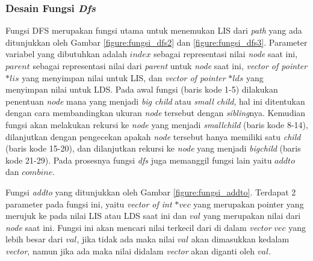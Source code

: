 	\subsubsection{\quad Desain Fungsi \textit{Dfs}}
	\quad Fungsi DFS merupakan fungsi utama untuk menemukan LIS dari \textit{path} yang ada ditunjukkan oleh Gambar \ref{figure:fungsi_dfs2} dan \ref{figure:fungsi_dfs3}. Parameter variabel yang dibutuhkan adalah $index$ sebagai representasi nilai \textit{node} saat ini, $parent$ sebagai representasi nilai dari \textit{parent} untuk \textit{node} saat ini, \textit{vector of pointer} $*lis$ yang menyimpan nilai untuk LIS, dan \textit{vector of pointer} $*lds$ yang menyimpan nilai untuk LDS. Pada awal fungsi (baris kode 1-5) dilakukan penentuan \textit{node} mana yang menjadi \textit{big child} atau \textit{small child}, hal ini ditentukan dengan cara membandingkan ukuran \textit{node} tersebut dengan \textit{sibling}nya. Kemudian fungsi akan melakukan rekursi ke \textit{node} yang menjadi \textit{smallchild} (baris kode 8-14), dilanjutkan dengan pengecekan apakah \textit{node} tersebut hanya memiliki satu \textit{child} (baris kode 15-20), dan dilanjutkan rekursi ke \textit{node} yang menjadi \textit{bigchild} (baris kode 21-29). Pada prosesnya fungsi \textit{dfs} juga memanggil fungsi lain yaitu $addto$ dan $combine$.
	 
	\quad Fungsi \textit{addto} yang ditunjukkan oleh Gambar \ref{figure:fungsi_addto}. Terdapat 2 parameter pada fungsi ini, yaitu \textit{vector of int} $*vec$ yang merupakan pointer yang merujuk ke pada nilai LIS atau LDS saat ini dan $val$ yang merupakan nilai dari \textit{node} saat ini. Fungsi ini akan mencari nilai terkecil dari di dalam \textit{vector} $vec$ yang lebih besar dari $val$, jika tidak ada maka nilai $val$ akan dimasukkan kedalam \textit{vector}, namun jika ada maka nilai didalam \textit{vector} akan diganti oleh $val$.
	
